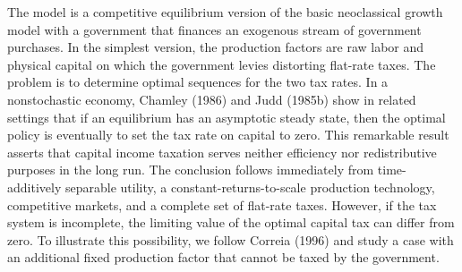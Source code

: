 The model is a competitive equilibrium
 version of the basic neoclassical growth model
with a government  that finances an exogenous stream of government
purchases. In the simplest version, the production factors are
raw labor and physical capital on which the government levies
distorting flat-rate taxes.  The problem is
to determine optimal sequences for
the two  tax rates. In a nonstochastic economy,
Chamley (1986) and Judd (1985b)
show in related settings that if an equilibrium has an
asymptotic steady state, then the optimal policy is eventually
to set the tax rate on capital to zero.
This remarkable result
asserts that capital income taxation serves neither efficiency
nor redistributive purposes in the long run.  The conclusion
follows immediately from time-additively separable utility,
a constant-returns-to-scale production technology,
competitive markets, and a complete set of flat-rate taxes.
However, if the tax system
is incomplete, the limiting value of the optimal capital tax
can  differ from zero.  To illustrate this possibility,
we follow Correia (1996)
and study a case with an additional fixed production factor that
cannot be taxed by the government.
%
%

